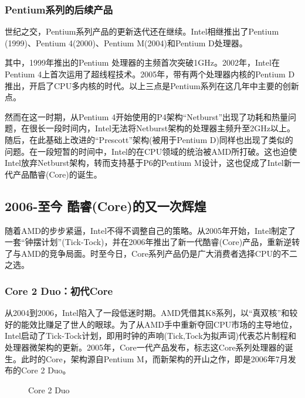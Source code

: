 \documentclass[UTF8]{ctexart}
\begin{document}
\subsubsection{Pentium系列的后续产品}
世纪之交，Pentium系列产品的更新迭代还在继续。Intel相继推出了Pentium \uppercase\expandafter{}(1999)、Pentium 4(2000)、Pentium M(2004)和Pentium D处理器。

其中，1999年推出的Pentium \uppercase\expandafter{}处理器的主频首次突破1GHz。2002年，Intel在Pentium 4上首次运用了超线程技术。2005年，带有两个处理器内核的Pentium D推出，开启了CPU多内核的时代。以上三点是Pentium系列在这几年中主要的创新点。

然而在这一时期，从Pentium 4开始使用的P4架构“Netburst”出现了功耗和热量问题，在很长一段时间内，Intel无法将Netburst架构的处理器主频升至2GHz以上。随后，在此基础上改进的“Prescott”架构(被用于Pentium D)同样也出现了类似的问题。在一段短暂的时间中，Intel的在CPU领域的统治被AMD所打破。这也迫使Intel放弃Netburst架构，转而支持基于P6的Pentium M设计，这也促成了Intel新一代产品酷睿(Core)的诞生。

\subsection{2006-至今 酷睿(Core)的又一次辉煌}
随着AMD的步步紧逼，Intel不得不调整自己的策略。从2005年开始，Intel制定了一套“钟摆计划”(Tick-Tock)，并在2006年推出了新一代酷睿(Core)产品，重新逆转了与AMD的竞争局面。时至今日，Core系列产品仍是广大消费者选择CPU的不二之选。
\subsubsection{Core 2 Duo：初代Core}
从2004到2006，Intel陷入了一段低迷时期。AMD凭借其K8系列，以“真双核”和较好的能效比赚足了世人的眼球。为了从AMD手中重新夺回CPU市场的主导地位，Intel启动了Tick-Tock计划，即用时钟的声响(Tick,Tock为拟声词)代表芯片制程和处理器微架构的更新。2005年，Core一代产品发布，标志这Core系列处理器的诞生。此时的Core，架构源自Pentium M，而新架构的开山之作，即是2006年7月发布的Core 2 Duo。
\begin{figure}[H]
    \centering
    \caption{Core 2 Duo}
\end{figure}
\end{document}

